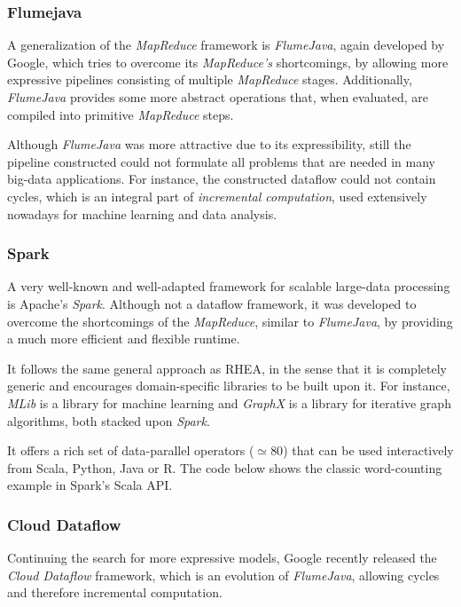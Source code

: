 \documentclass[sigplan,review,anonymous]{acmart}\settopmatter{printfolios=true,printacmref=false}
\begin{document}
\subsubsection{Flumejava}

A generalization of the \textit{MapReduce} framework is \textit{FlumeJava}, again developed by Google, which tries to overcome its \textit{MapReduce's } shortcomings, by allowing more expressive pipelines consisting of multiple \textit{MapReduce} stages. Additionally, \textit{FlumeJava} provides some more abstract operations that, when evaluated, are compiled into primitive \textit{MapReduce} steps.

Although \textit{FlumeJava} was more attractive due to its expressibility, still the pipeline constructed could not formulate all problems that are needed in many big-data applications. For instance, the constructed dataflow could not contain cycles, which is an integral part of \textit{incremental computation}, used extensively nowadays for machine learning and data analysis.

\subsubsection{Spark}

A very well-known and well-adapted framework for scalable large-data processing is Apache's \textit{Spark}. Although not a dataflow framework, it was developed to overcome the shortcomings of the \textit{MapReduce}, similar to \textit{FlumeJava}, by providing a much more efficient and flexible runtime.

It follows the same general approach as \textsc{RHEA}, in the sense that it is completely generic and encourages domain-specific libraries to be built upon it. For instance, \textit{MLib} is a library for machine learning and \textit{GraphX} is a library for iterative graph algorithms, both stacked upon \textit{Spark}.

It offers a rich set of data-parallel operators ($\simeq 80$) that can be used interactively from Scala, Python, Java or R. The code below shows the classic word-counting example in Spark's Scala API.


\subsubsection{Cloud Dataflow}

Continuing the search for more expressive models, Google recently released the \textit{Cloud Dataflow} framework, which is an evolution of \textit{FlumeJava}\cite{flumejava}, allowing cycles and therefore incremental computation.
\end{document}
